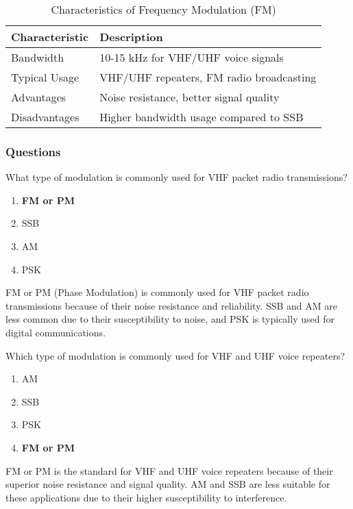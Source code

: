 \begin{table}[htbp]
    \centering
    \caption{Characteristics of Frequency Modulation (FM)}
    \label{tab:fm-characteristics}
    \begin{tabular}{|l|l|}
        \hline
        \textbf{Characteristic} & \textbf{Description} \\
        \hline
        Bandwidth & 10-15 kHz for VHF/UHF voice signals \\
        \hline
        Typical Usage & VHF/UHF repeaters, FM radio broadcasting \\
        \hline
        Advantages & Noise resistance, better signal quality \\
        \hline
        Disadvantages & Higher bandwidth usage compared to SSB \\
        \hline
    \end{tabular}
\end{table}

\subsubsection*{Questions}

\begin{tcolorbox}[colback=gray!10!white,colframe=black!75!black,title={T8A02}]
    What type of modulation is commonly used for VHF packet radio transmissions?
    \begin{enumerate}[label=\Alph*),noitemsep]
        \item \textbf{FM or PM}
        \item SSB
        \item AM
        \item PSK
    \end{enumerate}
\end{tcolorbox}
FM or PM (Phase Modulation) is commonly used for VHF packet radio transmissions because of their noise resistance and reliability. SSB and AM are less common due to their susceptibility to noise, and PSK is typically used for digital communications.

\begin{tcolorbox}[colback=gray!10!white,colframe=black!75!black,title={T8A04}]
    Which type of modulation is commonly used for VHF and UHF voice repeaters?
    \begin{enumerate}[label=\Alph*),noitemsep]
        \item AM
        \item SSB
        \item PSK
        \item \textbf{FM or PM}
    \end{enumerate}
\end{tcolorbox}
FM or PM is the standard for VHF and UHF voice repeaters because of their superior noise resistance and signal quality. AM and SSB are less suitable for these applications due to their higher susceptibility to interference.

